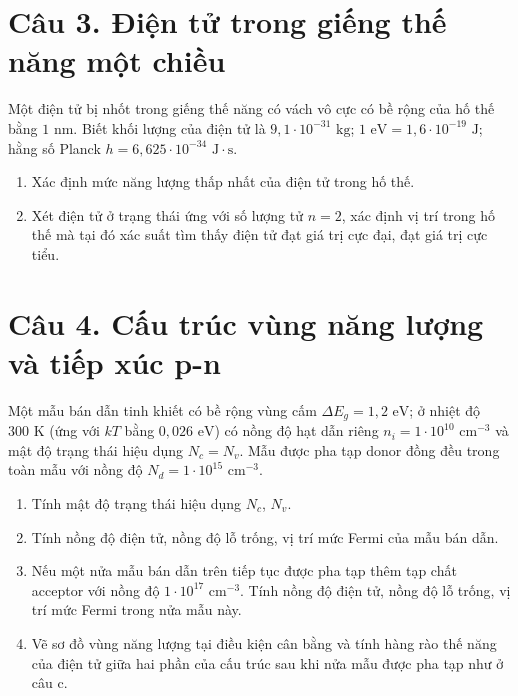 \documentclass[11pt,a4paper]{article}
\begin{document}
\section*{Câu 3. Điện tử trong giếng thế năng một chiều}

Một điện tử bị nhốt trong giếng thế năng có vách vô cực có bề rộng của hố thế bằng $1\text{ nm}$. Biết khối lượng của điện tử là $9{,}1 \cdot 10^{-31}\text{ kg}$; $1\text{ eV} = 1{,}6 \cdot 10^{-19}\text{ J}$; hằng số Planck $h = 6{,}625 \cdot 10^{-34}\text{ J}\cdot\text{s}$.

\begin{enumerate}[label=\alph*., leftmargin=*, topsep=2pt, itemsep=1pt, parsep=0pt]
    \item Xác định mức năng lượng thấp nhất của điện tử trong hố thế.
    \item Xét điện tử ở trạng thái ứng với số lượng tử $n = 2$, xác định vị trí trong hố thế mà tại đó xác suất tìm thấy điện tử đạt giá trị cực đại, đạt giá trị cực tiểu.
\end{enumerate}

\section*{Câu 4. Cấu trúc vùng năng lượng và tiếp xúc p-n}

Một mẫu bán dẫn tinh khiết có bề rộng vùng cấm $\Delta E_g = 1{,}2\text{ eV}$; ở nhiệt độ $300\text{ K}$ (ứng với $kT$ bằng $0{,}026\text{ eV}$) có nồng độ hạt dẫn riêng $n_i = 1 \cdot 10^{10}\text{ cm}^{-3}$ và mật độ trạng thái hiệu dụng $N_c = N_v$. Mẫu được pha tạp donor đồng đều trong toàn mẫu với nồng độ $N_d = 1 \cdot 10^{15}\text{ cm}^{-3}$.

\begin{enumerate}[label=\alph*., leftmargin=*, topsep=2pt, itemsep=1pt, parsep=0pt]
    \item Tính mật độ trạng thái hiệu dụng $N_c$, $N_v$.
    \item Tính nồng độ điện tử, nồng độ lỗ trống, vị trí mức Fermi của mẫu bán dẫn.
    \item Nếu một nửa mẫu bán dẫn trên tiếp tục được pha tạp thêm tạp chất acceptor với nồng độ $1 \cdot 10^{17}\text{ cm}^{-3}$. Tính nồng độ điện tử, nồng độ lỗ trống, vị trí mức Fermi trong nửa mẫu này.
    \item Vẽ sơ đồ vùng năng lượng tại điều kiện cân bằng và tính hàng rào thế năng của điện tử giữa hai phần của cấu trúc sau khi nửa mẫu được pha tạp như ở câu c.
\end{enumerate}
\end{document}
